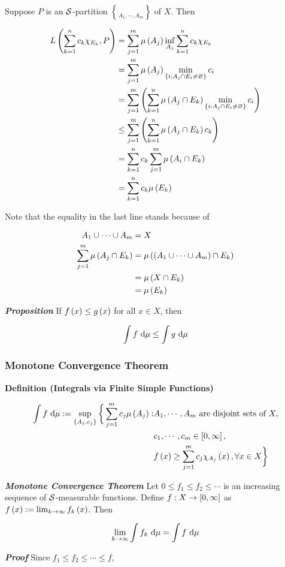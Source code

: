 \documentclass[
]{article}
\begin{document}
Suppose \(P\) is an \(\S\)-partition \(\brace{A_1,\cdots ,A_m}\) of
\(X\). Then

\[\ba
L\pr{\sum_{k = 1}^nc_k\chi_{E_k},P} & = \sum_{j = 1}^m\lm{A_j}\inf_{A_j}\sum_{k = 1}^nc_k\chi_{E_k} \\
& = \sum_{j = 1}^m\lm{A_j}\min_{\brace{i:A_j\cap E_i\ne \empty}}c_i\\
& = \sum_{j = 1}^m\pr{\sum_{k = 1}^n \lm{A_j\cap E_k}\min_{\brace{i:A_j\cap E_i\ne \empty}}c_i}\\
& \le \sum_{j = 1}^m\pr{\sum_{k = 1}^n \lm{A_j\cap E_k}c_k}\\
& = \sum_{k = 1}^nc_k\sum_{j = 1}^m\lm{A_i\cap E_k}\\
& = \sum_{k = 1}^nc_k \lm{E_k}
\ea\]

Note that the equality in the last line stands because of

\[\ba
A_1\cup\cdots \cup A_m & = X\\
\sum_{j = 1}^m\lm{A_j\cap E_k} & = \lm{\pr{A_1\cup\cdots \cup A_m}\cap E_k}\\
& = \lm{X\cap E_k}\\
& = \lm{E_k}
\ea\]

\emph{\textbf{Proposition}} If \(f\pr x\le g\pr x\) for all \(x\in X\),
then

\[\int f\dm \le \int g\dm\]

\hypertarget{monotone-convergence-theorem}{%
\subsubsection{Monotone Convergence
Theorem}\label{monotone-convergence-theorem}}

\textbf{Definition (Integrals via Finite Simple Functions)}

\[\ba
\int f\dm := \sup_{\brace{A_j,c_j}} \bigg\{\sum_{j = 1}^m c_j\lm{A_j}: & A_1,\cdots ,A_m\text{ are disjoint sets of }X,\\ 
& c_1,\cdots ,c_m \in \br{0,\infty},\\
& f\pr{x}\ge \sum_{j = 1}^m c_j\chi_{A_j}\pr{x},\forall x\in X\bigg\}
\ea\]

\emph{\textbf{Monotone Convergence Theorem}} Let
\(0\le f_1\le f_2\le \cdots\) is an increasing sequence of
\(\S\)-measurable functions. Define \(f: X\to \br{0,\infty}\) as
\(f\pr{x}:=\lim_{k\to \infty}f_k\pr{x}\). Then

\[\lim_{k\to\infty} \int f_k\dm = \int f\dm\]

\emph{\textbf{Proof}} Since \(f_1\le f_2\le \cdots \le f\),
\end{document}
